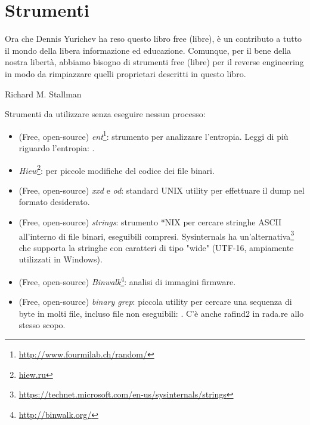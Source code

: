 \chapter{Strumenti}

\epigraph{Ora che Dennis Yurichev ha reso questo libro free (libre), è un
contributo a tutto il mondo della libera informazione ed educazione.
Comunque, per il bene della nostra libertà, abbiamo bisogno di strumenti free (libre) per il reverse
engineering in modo da rimpiazzare quelli proprietari descritti in questo libro.}{Richard M. Stallman}


Strumenti da utilizzare senza eseguire nessun processo:


\begin{itemize}
\item
(Free, open-source) \emph{ent}\footnote{\url{http://www.fourmilab.ch/random/}}: strumento per analizzare l'entropia.
Leggi di più riguardo l'entropia: .

\item
\label{Hiew}
\emph{Hiew}\footnote{\href{http://go.yurichev.com/17035}{hiew.ru}}:
per piccole modifiche del codice dei file binari.

\item (Free, open-source) \emph{xxd} e \emph{od}: standard UNIX utility per effettuare il dump nel formato desiderato.

\item (Free, open-source) \emph{strings}: strumento *NIX per cercare stringhe ASCII all'interno di file binari, eseguibili compresi.
Sysinternals ha un'alternativa\footnote{\url{https://technet.microsoft.com/en-us/sysinternals/strings}}
che supporta la stringhe con caratteri di tipo "wide" (UTF-16, ampiamente utilizzati in Windows).

\item (Free, open-source) \emph{Binwalk}\footnote{\url{http://binwalk.org/}}: analisi di immagini firmware.

\item
{}
(Free, open-source) \emph{binary grep}:
piccola utility per cercare una sequenza di byte in molti file,
incluso file non eseguibili: \BGREPURL.
C'è anche rafind2 in rada.re allo stesso scopo.
\end{itemize}


